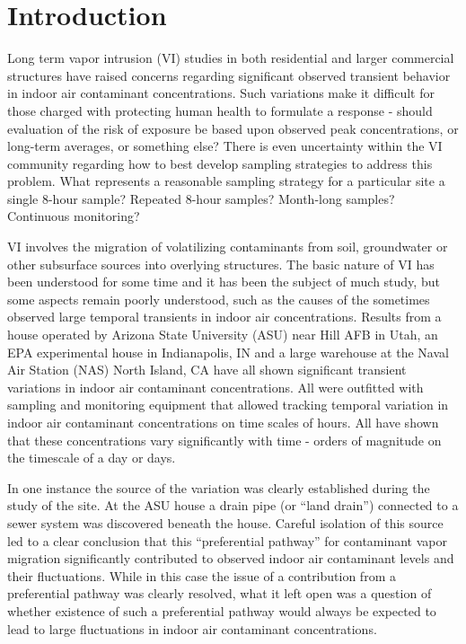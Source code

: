 \section{Introduction}\label{s:intro}

Long term vapor intrusion (VI) studies in both residential and larger commercial structures have raised concerns regarding significant observed transient behavior in indoor air contaminant concentrations\cite{u.s._environmental_protection_agency_oswer_2015,folkes_observed_2009,holton_temporal_2013,johnston_spatiotemporal_2014,hosangadi_high-frequency_2017,mchugh_recent_2017,u.s._environmental_protection_agency_assessment_2015}.
Such variations make it difficult for those charged with protecting human health to formulate a response - should evaluation of the risk of exposure be based upon observed peak concentrations, or long-term averages, or something else?
There is even uncertainty within the VI community regarding how to best develop sampling strategies to address this problem\cite{u.s._environmental_protection_agency_oswer_2015,holton_temporal_2013,johnson_integrated_2016}.
What represents a reasonable sampling strategy for a particular site a single 8-hour sample?
Repeated 8-hour samples?
Month-long samples?
Continuous monitoring?\par

VI involves the migration of volatilizing contaminants from soil, groundwater or other subsurface sources into overlying structures.
The basic nature of VI has been understood for some time and it has been the subject of much study, but some aspects remain poorly understood, such as the causes of the sometimes observed large temporal transients in indoor air concentrations.
Results from a house operated by Arizona State University (ASU) near Hill AFB in Utah, an EPA experimental house in Indianapolis, IN and a large warehouse at the Naval Air Station (NAS) North Island, CA have all shown significant transient variations in indoor air contaminant concentrations.
All were outfitted with sampling and monitoring equipment that allowed tracking temporal variation in indoor air contaminant concentrations on time scales of hours.
All have shown that these concentrations vary significantly with time - orders of magnitude on the timescale of a day or days\cite{holton_evaluation_2015,guo_vapor_2015,hosangadi_high-frequency_2017}.\par

In one instance the source of the variation was clearly established during the study of the site.
At the ASU house a drain pipe (or “land drain”) connected to a sewer system was discovered beneath the house.
Careful isolation of this source led to a clear conclusion that this “preferential pathway” for contaminant vapor migration significantly contributed to observed indoor air contaminant levels and their fluctuations\cite{guo_vapor_2015,guo_identification_2015}.
While in this case the issue of a contribution from a preferential pathway was clearly resolved, what it left open was a question of whether existence of such a preferential pathway would always be expected to lead to large fluctuations in indoor air contaminant concentrations.\par

